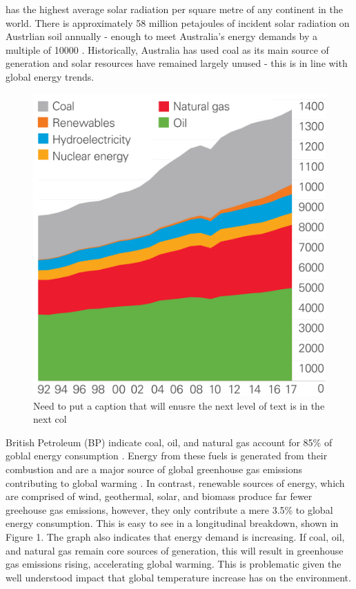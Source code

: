 \documentclass[10pt,journal,compsoc]{IEEEtran}
\begin{document}
		 has the highest average solar radiation per square metre of any continent in the world. There is approximately 58 million petajoules of incident solar radiation on Austrlian soil annually - enough to meet Australia's energy demands by a multiple of 10000 \cite{Australia:2014}. Historically, Australia has used coal as its main source of generation and solar resources have remained largely unused - this is in line with global energy trends.
		\begin{figure}[h]
			\centering
			\includegraphics[scale=0.1]{globa_energy}
			\caption{Need to put a caption that will enusre the next level of text is in the next col}
		\end{figure}
		
		British Petroleum (BP) indicate coal, oil, and natural gas account for 85\% of goblal energy consumption \cite{BP:201806}. Energy from these fuels is generated from their combustion and are a major source of global greenhouse gas emissions contributing to global warming \cite{Azapagic:2011}. In contrast, renewable sources of energy, which are comprised of wind, geothermal, solar, and biomass produce far fewer greehouse gas emissions, however, they only contribute a mere 3.5\% to global energy consumption. This is easy to see in a longitudinal breakdown, shown in Figure 1. The graph also indicates that energy demand is increasing. If coal, oil, and natural gas remain core sources of generation, this will result in greenhouse gas emissions rising, accelerating global warming. This is problematic given the well understood impact that global temperature increase has on the environment.\\
		
\end{document}
